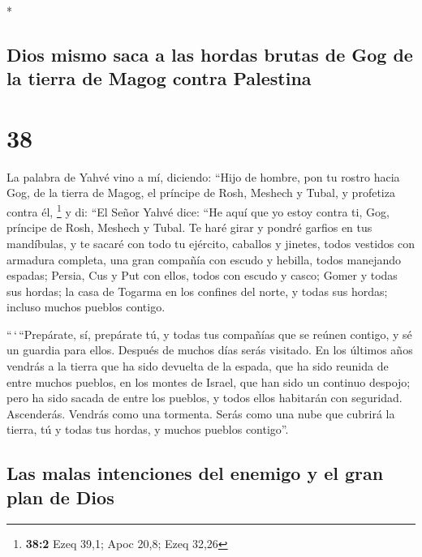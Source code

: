 \begin{paracol}{2}
\begin{otherlanguage}{english}
\end{otherlanguage}

\switchcolumn[0]*

\hypertarget{dios-mismo-saca-a-las-hordas-brutas-de-gog-de-la-tierra-de-magog-contra-palestina}{%
\subsection{Dios mismo saca a las hordas brutas de Gog de la tierra de
Magog contra
Palestina}\label{dios-mismo-saca-a-las-hordas-brutas-de-gog-de-la-tierra-de-magog-contra-palestina}}

\hypertarget{section-74}{%
\section{38}\label{section-74}}

 La palabra de Yahvé vino a mí, diciendo: 
``Hijo de hombre, pon tu rostro hacia Gog, de la tierra de Magog, el
príncipe de Rosh, Meshech y Tubal, y profetiza contra él, \footnote{\textbf{38:2}
  Ezeq 39,1; Apoc 20,8; Ezeq 32,26}  y di: ``El Señor
Yahvé dice: ``He aquí que yo estoy contra ti, Gog, príncipe de Rosh,
Meshech y Tubal.  Te haré girar y pondré garfios en tus
mandíbulas, y te sacaré con todo tu ejército, caballos y jinetes, todos
vestidos con armadura completa, una gran compañía con escudo y hebilla,
todos manejando espadas;  Persia, Cus y Put con ellos,
todos con escudo y casco;  Gomer y todas sus hordas; la
casa de Togarma en los confines del norte, y todas sus hordas; incluso
muchos pueblos contigo.

 ``\,`\,``Prepárate, sí, prepárate tú, y todas tus
compañías que se reúnen contigo, y sé un guardia para ellos.
 Después de muchos días serás visitado. En los últimos
años vendrás a la tierra que ha sido devuelta de la espada, que ha sido
reunida de entre muchos pueblos, en los montes de Israel, que han sido
un continuo despojo; pero ha sido sacada de entre los pueblos, y todos
ellos habitarán con seguridad.  Ascenderás. Vendrás como
una tormenta. Serás como una nube que cubrirá la tierra, tú y todas tus
hordas, y muchos pueblos contigo''.

\hypertarget{las-malas-intenciones-del-enemigo-y-el-gran-plan-de-dios}{%
\subsection{Las malas intenciones del enemigo y el gran plan de
Dios}\label{las-malas-intenciones-del-enemigo-y-el-gran-plan-de-dios}}


\end{paracol}
